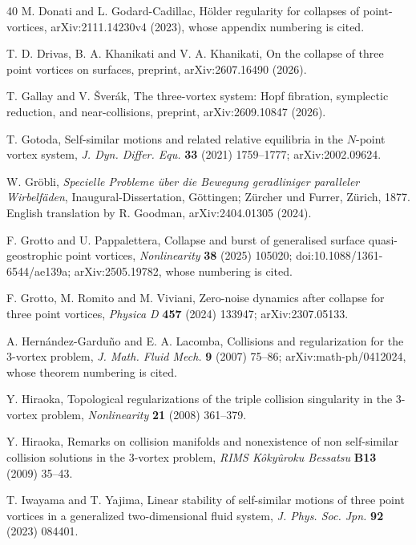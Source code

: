 \documentclass[11pt]{article}
\theoremstyle{definition}
\begin{document}
\begin{thebibliography}{40}
 M. Donati and L. Godard-Cadillac, H\"older regularity for collapses of point-vortices, arXiv:2111.14230v4 (2023), whose appendix numbering is cited.

 T. D. Drivas, B. A. Khanikati and V. A. Khanikati, On the collapse of three point vortices on surfaces, preprint, arXiv:2607.16490 (2026).

 T. Gallay and V. \v{S}ver\'ak, The three-vortex system: Hopf fibration, symplectic reduction, and near-collisions, preprint, arXiv:2609.10847 (2026).

 T. Gotoda, Self-similar motions and related relative equilibria in the $N$-point vortex system, \emph{J. Dyn. Differ. Equ.} \textbf{33} (2021) 1759--1777; arXiv:2002.09624.

 W. Gr\"obli, \emph{Specielle Probleme \"uber die Bewegung geradliniger paralleler Wirbelf\"aden}, Inaugural-Dissertation, G\"ottingen; Z\"urcher und Furrer, Z\"urich, 1877. English translation by R. Goodman, arXiv:2404.01305 (2024).

 F. Grotto and U. Pappalettera, Collapse and burst of generalised surface quasi-geostrophic point vortices, \emph{Nonlinearity} \textbf{38} (2025) 105020; doi:10.1088/1361-6544/ae139a; arXiv:2505.19782, whose numbering is cited.

 F. Grotto, M. Romito and M. Viviani, Zero-noise dynamics after collapse for three point vortices, \emph{Physica D} \textbf{457} (2024) 133947; arXiv:2307.05133.

 A. Hern\'andez-Gardu\~no and E. A. Lacomba, Collisions and regularization for the 3-vortex problem, \emph{J. Math. Fluid Mech.} \textbf{9} (2007) 75--86; arXiv:math-ph/0412024, whose theorem numbering is cited.

 Y. Hiraoka, Topological regularizations of the triple collision singularity in the 3-vortex problem, \emph{Nonlinearity} \textbf{21} (2008) 361--379.

 Y. Hiraoka, Remarks on collision manifolds and nonexistence of non self-similar collision solutions in the 3-vortex problem, \emph{RIMS K\^oky\^uroku Bessatsu} \textbf{B13} (2009) 35--43.

 T. Iwayama and T. Yajima, Linear stability of self-similar motions of three point vortices in a generalized two-dimensional fluid system, \emph{J. Phys. Soc. Jpn.} \textbf{92} (2023) 084401.


\end{thebibliography}
\end{document}
